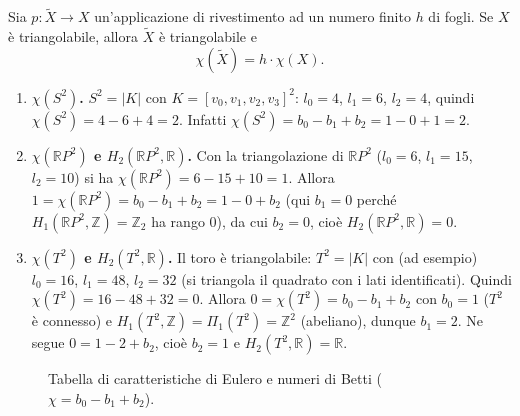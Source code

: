 \begin{teo}
Sia $p: \widetilde{X} \to X$ un'applicazione di rivestimento ad un numero finito $h$ di fogli. Se $X$ \`e triangolabile, allora $\widetilde{X}$ \`e triangolabile e
\[
\chi(\widetilde{X}) = h \cdot \chi(X) .
\]
\end{teo}


\begin{ejemplo}
\begin{enumerate}
    \item[3)] \textbf{$\chi(S^2)$.} $S^2 = |K|$ con $K = [v_0, v_1, v_2, v_3]^2$: $l_0 = 4$, $l_1 = 6$, $l_2 = 4$, quindi $\chi(S^2) = 4 - 6 + 4 = 2$. Infatti $\chi(S^2) = b_0 - b_1 + b_2 = 1 - 0 + 1 = 2$.
    \item[4)] \textbf{$\chi(\mathbb{R}P^2)$ e $H_2(\mathbb{R}P^2, \mathbb{R})$.} Con la triangolazione di $\mathbb{R}P^2$ ($l_0 = 6$, $l_1 = 15$, $l_2 = 10$) si ha $\chi(\mathbb{R}P^2) = 6 - 15 + 10 = 1$. Allora $1 = \chi(\mathbb{R}P^2) = b_0 - b_1 + b_2 = 1 - 0 + b_2$ (qui $b_1 = 0$ perch\'e $H_1(\mathbb{R}P^2, \mathbb{Z}) = \mathbb{Z}_2$ ha rango $0$), da cui $b_2 = 0$, cio\`e $H_2(\mathbb{R}P^2, \mathbb{R}) = 0$.
    \item[5)] \textbf{$\chi(T^2)$ e $H_2(T^2, \mathbb{R})$.} Il toro \`e triangolabile: $T^2 = |K|$ con (ad esempio) $l_0 = 16$, $l_1 = 48$, $l_2 = 32$ (si triangola il quadrato con i lati identificati). Quindi $\chi(T^2) = 16 - 48 + 32 = 0$. Allora $0 = \chi(T^2) = b_0 - b_1 + b_2$ con $b_0 = 1$ ($T^2$ \`e connesso) e $H_1(T^2, \mathbb{Z}) = \Pi_1(T^2) = \mathbb{Z}^2$ (abeliano), dunque $b_1 = 2$. Ne segue $0 = 1 - 2 + b_2$, cio\`e $b_2 = 1$ e $H_2(T^2, \mathbb{R}) = \mathbb{R}$.
\end{enumerate}
\end{ejemplo}

\begin{figure}[H]
    \centering
    \caption{Tabella di caratteristiche di Eulero e numeri di Betti ($\chi = b_0 - b_1 + b_2$).}
\end{figure}

